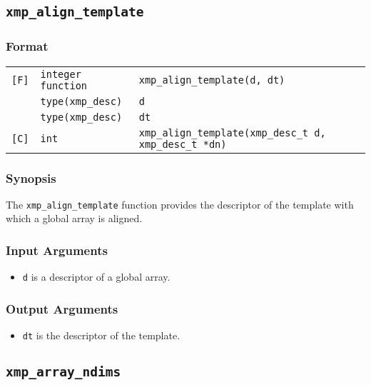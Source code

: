 \subsection{\tt xmp\_align\_template}

\subsubsection*{Format}

\begin{tabular}{lll}

\verb![F]!& {\tt integer function}& {\tt xmp\_align\_template(d, dt)}\\
          & {\tt type(xmp\_desc)} & {\tt d}\\
          & {\tt type(xmp\_desc)} & {\tt dt}\\

\verb![C]!&  {\tt int}& {\tt xmp\_align\_template(xmp\_desc\_t d, xmp\_desc\_t *dn)}\\

\end{tabular}

\subsubsection*{Synopsis}

The {\tt xmp\_align\_template} function provides the descriptor of the
template with which a global array is aligned.


\subsubsection*{Input Arguments}
\begin{itemize}
 \item {\tt d} is a descriptor of a global array.
\end{itemize}

\subsubsection*{Output Arguments}
\begin{itemize}
 \item {\tt dt} is the descriptor of the template.
\end{itemize}


\subsection{\tt xmp\_array\_ndims}

